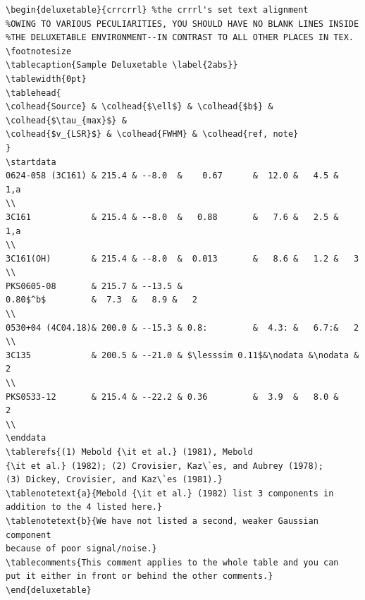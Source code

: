 \documentclass[12pt,preprint]{aastex}
\begin{document}
\begin{verbatim}
\begin{deluxetable}{crrcrrl} %the crrrl's set text alignment
%OWING TO VARIOUS PECULIARITIES, YOU SHOULD HAVE NO BLANK LINES INSIDE
%THE DELUXETABLE ENVIRONMENT--IN CONTRAST TO ALL OTHER PLACES IN TEX.
\footnotesize
\tablecaption{Sample Deluxetable \label{2abs}}
\tablewidth{0pt}
\tablehead{
\colhead{Source} & \colhead{$\ell$} & \colhead{$b$} &
\colhead{$\tau_{max}$} &
\colhead{$v_{LSR}$} & \colhead{FWHM} & \colhead{ref, note}
}
\startdata
0624-058 (3C161) & 215.4 & --8.0  &    0.67      &  12.0 &   4.5 &   1,a
\\
3C161            & 215.4 & --8.0  &   0.88       &   7.6 &   2.5 &   1,a
\\
3C161(OH)        & 215.4 & --8.0  &  0.013       &   8.6 &   1.2 &   3
\\
PKS0605-08       & 215.7 & --13.5 &
0.80$^b$         &  7.3  &   8.9 &   2
\\
0530+04 (4C04.18)& 200.0 & --15.3 & 0.8:         &  4.3: &   6.7:&   2
\\
3C135            & 200.5 & --21.0 & $\lesssim 0.11$&\nodata &\nodata & 2
\\
PKS0533-12       & 215.4 & --22.2 & 0.36         &  3.9  &   8.0 &    2
\\
\enddata
\tablerefs{(1) Mebold {\it et al.} (1981), Mebold
{\it et al.} (1982); (2) Crovisier, Kaz\`es, and Aubrey (1978);
(3) Dickey, Crovisier, and Kaz\`es (1981).}
\tablenotetext{a}{Mebold {\it et al.} (1982) list 3 components in
addition to the 4 listed here.}
\tablenotetext{b}{We have not listed a second, weaker Gaussian component
because of poor signal/noise.}
\tablecomments{This comment applies to the whole table and you can
put it either in front or behind the other comments.}
\end{deluxetable}
\end{verbatim}
\end{document}
